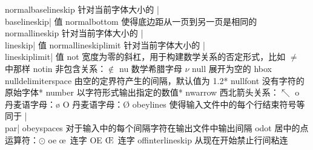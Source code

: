 \capcs normalbaselineskip {针对当前字体大小的 |\\baselineskip| 值}{}{}
\capcs normalbottom {使得底边距从一页到另一页是相同的}{}{}
\capcs normallineskip {针对当前字体大小的 |\\lineskip| 值}{}{}
\capcs normallineskiplimit {针对当前字体大小的  |\\lineskiplimit| 值}{}{}
\capcs not {宽度为零的斜杠，用于构建数学关系的否定形式，比如 $\not=$ 中那样}{}{}
\capcs notin {非包含关系：$\notin$}{}{}
\capcs nu {数学希腊字母 $\nu$}{}{}
\capcs null {展开为空的 hbox}{}{}
\capcs nulldelimiterspace {由空的定界符产生的间隔，默认值为 1.2\pt}*{}
\capcs nullfont {没有字符的原始字体}*{}
\capcs number {以字符形式输出指定的数值}*{}
\capcs nwarrow {西北箭头关系：$\nwarrow$}{}{}
%
\capcs o {丹麦语字母：\o}{}{}
\capcs O {丹麦语字母：\O}{}{}
\capcs obeylines {使得输入文件中的每个行结束符号等同于 |\\par|}{}{}
\capcs obeyspaces {对于输入中的每个间隔字符在输出文件中输出间隔}{}{}
\capcs odot {居中的点运算符：$\odot$}{}{}
\capcs oe {\oe\ 连字}{}{}
\capcs OE {\OE\ 连字}{}{}
\capcs offinterlineskip {从现在开始禁止行间粘连}{}{}
